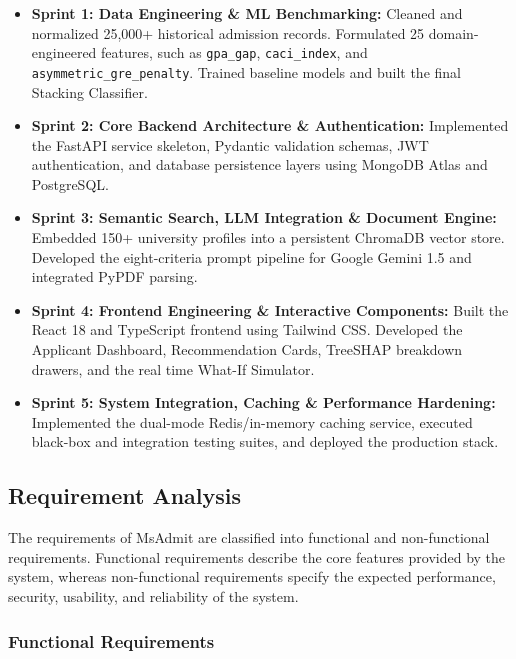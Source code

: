 \begin{itemize}
    \item \textbf{Sprint 1: Data Engineering \& ML Benchmarking:}
    Cleaned and normalized 25,000+ historical admission records. Formulated 25 domain-engineered features, such as \texttt{gpa\_gap}, \texttt{caci\_index}, and \texttt{asymmetric\_gre\_penalty}. Trained baseline models and built the final Stacking Classifier.

    \item \textbf{Sprint 2: Core Backend Architecture \& Authentication:}
    Implemented the FastAPI service skeleton, Pydantic validation schemas, JWT authentication, and database persistence layers using MongoDB Atlas and PostgreSQL.

    \item \textbf{Sprint 3: Semantic Search, LLM Integration \& Document Engine:}
    Embedded 150+ university profiles into a persistent ChromaDB vector store. Developed the eight-criteria prompt pipeline for Google Gemini 1.5 and integrated PyPDF parsing.

    \item \textbf{Sprint 4: Frontend Engineering \& Interactive Components:}
    Built the React 18 and TypeScript frontend using Tailwind CSS. Developed the Applicant Dashboard, Recommendation Cards, TreeSHAP breakdown drawers, and the real time What-If Simulator.

    \item \textbf{Sprint 5: System Integration, Caching \& Performance Hardening:}
    Implemented the dual-mode Redis/in-memory caching service, executed black-box and integration testing suites, and deployed the production stack.
\end{itemize}

\subsection{Requirement Analysis}

The requirements of MsAdmit are classified into functional and non-functional requirements. Functional requirements describe the core features provided by the system, whereas non-functional requirements specify the expected performance, security, usability, and reliability of the system.


\subsubsection{Functional Requirements}

